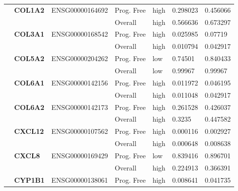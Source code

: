 \begin{spacing}{1}
{\begin{longtable}{|>{\bfseries}p{2cm}|>{\bfseries}p{1.9cm}|p{2.8cm}|p{2cm}|p{2cm}|p{1.5cm}|p{1.5cm}|}
            \hhline{~======}
             & COL1A2   & ENSG00000164692 & Prog. Free & high & 0.298023 & 0.456066                \\
            \hhline{~~~----}
             &          &                 & Overall    & high & 0.566636 & 0.673297                \\
            \hhline{~======}
             & COL3A1   & ENSG00000168542 & Prog. Free & high & 0.025985 & 0.07719                 \\
            \hhline{~~~----}
             &          &                 & Overall    & high & 0.010794 & 0.042917                \\
            \hhline{~======}
             & COL5A2   & ENSG00000204262 & Prog. Free & low  & 0.74501  & 0.840433                \\
            \hhline{~~~----}
             &          &                 & Overall    & low  & 0.99967  & 0.99967                 \\
            \hhline{~======}
             & COL6A1   & ENSG00000142156 & Prog. Free & high & 0.011972 & 0.046195                \\
            \hhline{~~~----}
             &          &                 & Overall    & high & 0.011048 & 0.042917                \\
            \hhline{~======}
             & COL6A2   & ENSG00000142173 & Prog. Free & high & 0.261528 & 0.426037                \\
            \hhline{~~~----}
             &          &                 & Overall    & high & 0.3235   & 0.447582                \\
            \hhline{~======}
             & CXCL12   & ENSG00000107562 & Prog. Free & high & 0.000116 & 0.002927                \\
            \hhline{~~~----}
             &          &                 & Overall    & high & 0.000648 & 0.008638                \\
            \hhline{~======}
             & CXCL8    & ENSG00000169429 & Prog. Free & low  & 0.839416 & 0.896701                \\
            \hhline{~~~----}
             &          &                 & Overall    & high & 0.224913 & 0.366391                \\
            \hhline{~======}
             & CYP1B1   & ENSG00000138061 & Prog. Free & high & 0.008641 & 0.041735                \\

\end{longtable}}
\end{spacing}
